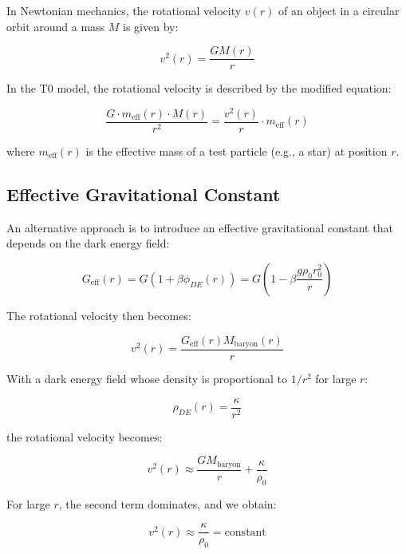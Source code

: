 \documentclass[a4paper,12pt]{article}
\theoremstyle{definition}
\theoremstyle{remark}
\begin{document}
	In Newtonian mechanics, the rotational velocity $v(r)$ of an object in a circular orbit around a mass $M$ is given by:
	
	\begin{equation}
		v^2(r) = \frac{GM(r)}{r}
	\end{equation}
	
	In the T0 model, the rotational velocity is described by the modified equation:
	
	\begin{equation}
		\frac{G \cdot m_{\text{eff}}(r) \cdot M(r)}{r^2} = \frac{v^2(r)}{r} \cdot m_{\text{eff}}(r)
	\end{equation}
	
	where $m_{\text{eff}}(r)$ is the effective mass of a test particle (e.g., a star) at position $r$.
	
	\subsection{Effective Gravitational Constant}
	
	An alternative approach is to introduce an effective gravitational constant that depends on the dark energy field:
	
	\begin{equation}
		G_{\text{eff}}(r) = G\left(1 + \beta\phi_{DE}(r)\right) = G\left(1 - \beta\frac{g\rho_0 r_0^2}{r}\right)
	\end{equation}
	
	The rotational velocity then becomes:
	
	\begin{equation}
		v^2(r) = \frac{G_{\text{eff}}(r)M_{\text{baryon}}(r)}{r}
	\end{equation}
	
	With a dark energy field whose density is proportional to $1/r^2$ for large $r$:
	
	\begin{equation}
		\rho_{DE}(r) = \frac{\kappa}{r^2}
	\end{equation}
	
	the rotational velocity becomes:
	
	\begin{equation}
		v^2(r) \approx \frac{GM_{\text{baryon}}}{r} + \frac{\kappa}{\rho_0}
	\end{equation}
	
	For large $r$, the second term dominates, and we obtain:
	
	\begin{equation}
		v^2(r) \approx \frac{\kappa}{\rho_0} = \text{constant}
	\end{equation}
	
\end{document}
